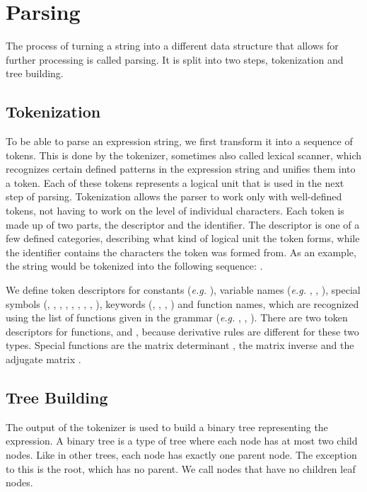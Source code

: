 \documentclass[12pt, a4paper]{report}
\begin{document}
\section{Parsing}
The process of turning a string into a different data structure that allows for further processing is called parsing.
It is split into two steps, tokenization and tree building.

\subsection{Tokenization}
To be able to parse an expression string, we first transform it into a sequence of tokens.
This is done by the tokenizer, sometimes also called lexical scanner, which recognizes certain defined patterns in the expression string and unifies them into a token.
Each of these tokens represents a logical unit that is used in the next step of parsing.
Tokenization allows the parser to work only with well-defined tokens, not having to work on the level of individual characters.
Each token is made up of two parts, the descriptor and the identifier.
The descriptor is one of a few defined categories, describing what kind of logical unit the token forms, while the identifier contains the characters the token was formed from.
As an example, the string  would be tokenized into the following sequence: .

We define token descriptors for constants (\textit{e.g.} ), variable names (\textit{e.g.} , , ), special symbols (, , , , , , , , ), keywords (, , , ) and function names, which are recognized using the list of functions given in the grammar (\textit{e.g.}  , , ).
There are two token descriptors for functions,  and , because derivative rules are different for these two types.
Special functions are the matrix determinant , the matrix inverse  and the adjugate matrix .

\subsection{Tree Building}
The output of the tokenizer is used to build a binary tree representing the expression.
A binary tree is a type of tree where each node has at most two child nodes.
Like in other trees, each node has exactly one parent node.
The exception to this is the root, which has no parent.
We call nodes that have no children leaf nodes.
\end{document}
